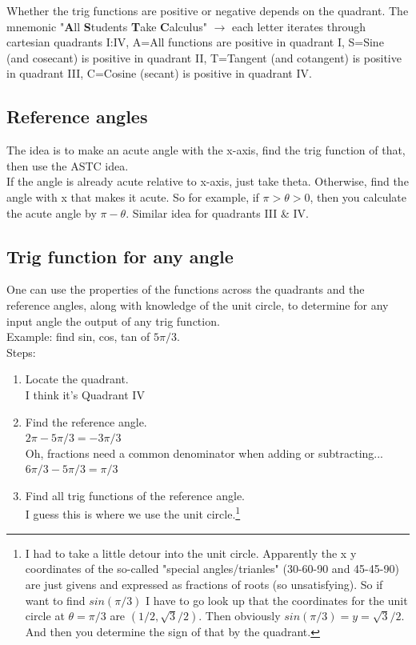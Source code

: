 \documentclass{article}
\begin{document}
Whether the trig functions are positive or negative depends on the quadrant. The mnemonic
"\textbf{A}ll \textbf{S}tudents \textbf{T}ake \textbf{C}alculus" $\rightarrow$ each letter
iterates through cartesian quadrants I:IV, A=All functions are positive in quadrant I,
S=Sine (and cosecant) is positive in quadrant II, T=Tangent (and cotangent) is positive in
quadrant III, C=Cosine (secant) is positive in quadrant IV. 


\subsection{Reference angles}

The idea is to make an acute angle with the x-axis, find the trig function of that, then
use the ASTC idea.\\

If the angle is already acute relative to x-axis, just take theta. Otherwise, find the
angle with x that makes it acute. So for example, if $\pi > \theta > 0$, then you
calculate the acute angle by $\pi - \theta$. Similar idea for quadrants III \& IV.

\subsection{Trig function for any angle}

One can use the properties of the functions across the quadrants and the reference angles,
along with knowledge of the unit circle, to determine for any input angle the output of
any trig function.\\

Example: find sin, cos, tan of $5\pi/3$.\\

Steps:
\begin{enumerate}
    \item Locate the quadrant.\\
        I think it's Quadrant IV\\
    \item Find the reference angle.\\
        $2\pi - 5\pi/3 = -3\pi / 3$\\
        Oh, fractions need a common denominator when adding or subtracting...\\
        $6\pi/3 - 5\pi/3 = \pi/3$\\
    \item Find all trig functions of the reference angle.\\
        I guess this is where we use the unit circle.\footnote{I had to take a little
            detour into the unit circle. Apparently the x y coordinates of the so-called
            "special angles/trianles" (30-60-90 and 45-45-90) are just givens and
            expressed as fractions of roots (so unsatisfying). So if want to find
            $sin(\pi/3)$ I have to go look up that the coordinates for the unit circle at
            $\theta = \pi/3$ are $(1/2, \sqrt{3}/2)$. Then obviously $sin(\pi/3) = y =
            \sqrt{3}/2$. And then you determine the sign of that by the quadrant.}
        
\end{enumerate}
\end{document}
